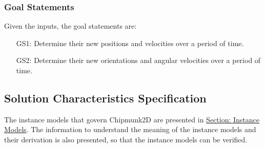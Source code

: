 \documentclass[12pt]{article}
\begin{document}
\subsubsection{Goal Statements}
\label{Sec:GoalStmt}
Given the inputs, the goal statements are:
\begin{itemize}
\item[GS1:]Determine their new positions and velocities over a period of time.
\item[GS2:]Determine their new orientations and angular velocities over a period of time.
\end{itemize}
\subsection{Solution Characteristics Specification}
\label{Sec:SolCharSpec}
The instance models that govern Chipmunk2D are presented in \hyperref[Sec:IMs]{Section: Instance Models}. The information to understand the meaning of the instance models and their derivation is also presented, so that the instance models can be verified.
\end{document}

